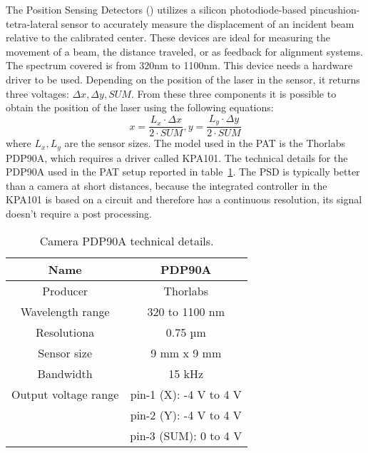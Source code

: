 The Position Sensing Detectors () utilizes a silicon photodiode-based pincushion-tetra-lateral sensor to accurately measure the displacement of an incident beam relative to the calibrated center. These devices are ideal for measuring the movement of a beam, the distance traveled, or as feedback for alignment systems.
The spectrum covered is from 320nm to 1100nm. This device needs a hardware driver to be used. Depending on the position of the laser in the sensor, it returns three voltages: $\Delta x, \Delta y, SUM$.
From these three components it is possible to obtain the position of the laser using the following equations:
\begin{equation}
      x = \frac{L_x \cdot \Delta x}{2 \cdot SUM}, y = \frac{L_y \cdot \Delta y}{2 \cdot  SUM}
\end{equation}
where $L_x,L_y$ are the sensor sizes. The model used in the PAT is the Thorlabs PDP90A, which requires a driver called KPA101. The technical details for the PDP90A used in the PAT setup reported in table~\ref{table:2}.
The PSD is typically better than a camera at short distances, because the integrated controller in the KPA101 is based on a circuit and therefore has a continuous resolution, its signal doesn't require a post processing.

\begin{table}[h!]
      \centering
      \begin{tabular}{ |c|c| }
            \hline
            Name                 & PDP90A                 \\\hline
            Producer             & Thorlabs               \\\hline
            Wavelength range     & 320 to 1100 nm         \\\hline
            Resolutiona          & 0.75 µm                \\\hline
            Sensor size          & 9 mm x 9 mm            \\\hline
            Bandwidth            & 15 kHz                 \\\hline
            Output voltage range & pin-1 (X): -4 V to 4 V \\
                                 & pin-2 (Y): -4 V to 4 V \\
                                 & pin-3 (SUM): 0 to 4 V  \\\hline
      \end{tabular}
      \caption{Camera PDP90A technical details.}
      \label{table:2}
\end{table}

